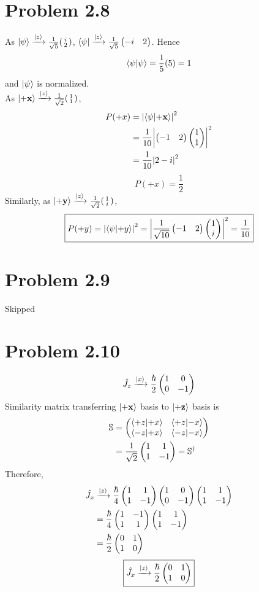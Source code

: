 \documentclass{article}
\begin{document}
\section*{Problem 2.8}
As $\ket{\psi} \xrightarrow{\ket{z}} \frac{1}{\sqrt{5}} \spmqty{i \\ 2}$, $\bra{\psi} \xrightarrow{\ket{z}} \frac{1}{\sqrt{5}}\pmqty{-i & 2}$. Hence
\[
  \braket{\psi} = \frac{1}{5} (5) = 1
\]
and $\ket{\psi}$ is normalized. \\
As $\px \basexp{z} \frac{1}{\sqrt{2}} \spmqty{1 \\ 1}$, 
\[
  \begin{split}
    P(+x) &= \abs{\braket{\psi}{\vb{+x}}}^2 \\
    &= \frac{1}{10} \abs{\pmqty{-1 & 2}\pmqty{1 \\ 1}}^2 \\
    &= \frac{1}{10} \abs{2-i}^2 
  \end{split}
\]
\[
  \boxed{
    P(+x) = \frac{1}{2}
  }  
\]
Similarly, as $\py \basexp{z} \frac{1}{\sqrt{2}} \spmqty{1 \\ i}$, 
\[
  \boxed{
    P(+y) = \abs{\braket{\psi}{+y}}^2 =\abs{\frac{1}{\sqrt{10}}\pmqty{-1 & 2} \pmqty{1 \\ i}}^2= \frac{1}{10}
  }
\]
\section*{Problem 2.9}
Skipped 
\section*{Problem 2.10}
\[ 
  \hat{J_z} \xrightarrow{\ket{x}}
  \frac{\hbar}{2} \pmqty{1 & 0 \\ 0 & -1}
\]
Similarity matrix transferring $\ket{\vb{+x}}$ basis to $\ket{\vb{+z}}$ basis is 
\[ 
  \begin{split}
    \mathbb{S} &= \sm{+z}{-z}{+x}{-x} \\
    &= \frac{1 }{\sqrt{2}} \pmqty{1 & 1 \\ 1 & -1} = \mathbb{S}^{\dagger}
  \end{split}
\]
Therefore,
\[ 
  \begin{split}
    \hat{J_x} &\basexp{z} 
    \frac{\hbar}{4} \pmqty{1 & 1 \\ 1 & -1} \pmqty{1 & 0 \\ 0 & -1} \pmqty{1 & 1 \\ 1 & -1}\\
    &= \frac{\hbar}{4} \pmqty{1 & -1 \\ 1 & 1} \pmqty{1 & 1 \\ 1 & -1} \\
    &= \frac{\hbar}{2} \pmqty{0 & 1 \\ 1 & 0}
  \end{split}
\]
\[ 
  \boxed{
    \hat{J_x} \basexp{z} \frac{\hbar}{2} \pmqty{0 & 1 \\ 1 & 0}
  }
\]
\end{document}
